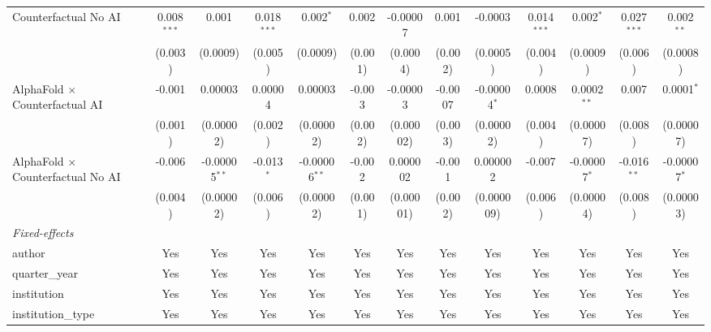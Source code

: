 \begin{tabular}{lcccccccccccc}
   Counterfactual No AI                     & 0.008$^{***}$ & 0.001           & 0.018$^{***}$ & 0.002$^{*}$     & 0.002        & -0.00007      & 0.001       & -0.0003        & 0.014$^{***}$ & 0.002$^{*}$    & 0.027$^{***}$ & 0.002$^{**}$\\   
                                            & (0.003)       & (0.0009)        & (0.005)       & (0.0009)        & (0.001)      & (0.0004)      & (0.002)     & (0.0005)       & (0.004)       & (0.0009)       & (0.006)       & (0.0008)\\   
   AlphaFold $\times$ Counterfactual AI     & -0.001        & 0.00003         & 0.00004       & 0.00003         & -0.003       & -0.00003      & -0.0007     & -0.00004$^{*}$ & 0.0008        & 0.0002$^{**}$  & 0.007         & 0.0001$^{*}$\\   
                                            & (0.001)       & (0.00002)       & (0.002)       & (0.00002)       & (0.002)      & (0.00002)     & (0.003)     & (0.00002)      & (0.004)       & (0.00007)      & (0.008)       & (0.00007)\\   
   AlphaFold $\times$ Counterfactual No AI  & -0.006        & -0.00005$^{**}$ & -0.013$^{*}$  & -0.00006$^{**}$ & -0.002       & 0.000002      & -0.001      & 0.000002       & -0.007        & -0.00007$^{*}$ & -0.016$^{**}$ & -0.00007$^{*}$\\   
                                            & (0.004)       & (0.00002)       & (0.006)       & (0.00002)       & (0.001)      & (0.00001)     & (0.002)     & (0.000009)     & (0.006)       & (0.00004)      & (0.008)       & (0.00003)\\   
   \midrule
   \emph{Fixed-effects}\\
   author                                   & Yes           & Yes             & Yes           & Yes             & Yes          & Yes           & Yes         & Yes            & Yes           & Yes            & Yes           & Yes\\  
   quarter\_year                            & Yes           & Yes             & Yes           & Yes             & Yes          & Yes           & Yes         & Yes            & Yes           & Yes            & Yes           & Yes\\  
   institution                              & Yes           & Yes             & Yes           & Yes             & Yes          & Yes           & Yes         & Yes            & Yes           & Yes            & Yes           & Yes\\  
   institution\_type                        & Yes           & Yes             & Yes           & Yes             & Yes          & Yes           & Yes         & Yes            & Yes           & Yes            & Yes           & Yes\\  

\end{tabular}
